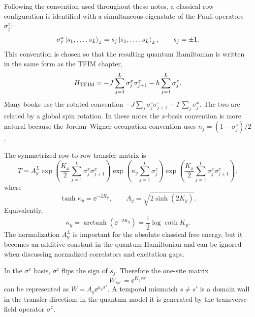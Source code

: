 Following the convention used throughout these notes, a classical row
configuration is identified with a simultaneous eigenstate of the Pauli
operators $\sigma_j^x$:
\begin{equation}
\label{eq:ising-tfim-x-basis-row-state}
    \sigma_j^x\left|s_1,\ldots,s_L\right\rangle_x
    =
    s_j\left|s_1,\ldots,s_L\right\rangle_x,
    \qquad
    s_j=\pm1 .
\end{equation}
This convention is chosen so that the resulting quantum Hamiltonian is written
in the same form as the TFIM chapter,
\begin{equation}
\label{eq:ising-tfim-quantum-hamiltonian-target}
    H_{\rm TFIM}
    =
    -J\sum_{j=1}^{L}\sigma_j^x\sigma_{j+1}^x
    -h\sum_{j=1}^{L}\sigma_j^z .
\end{equation}
Many books use the rotated convention
$-J\sum_j\sigma_j^z\sigma_{j+1}^z-\Gamma\sum_j\sigma_j^x$.  The two are related
by a global spin rotation.  In these notes the $x$-basis convention is more
natural because the Jordan--Wigner occupation convention uses
$n_j=(1-\sigma_j^z)/2$.

The symmetrized row-to-row transfer matrix is
\begin{equation}
\label{eq:ising-tfim-symmetric-transfer-matrix}
    T
    =
    A_y^L
    \exp\left(
        \frac{K_x}{2}\sum_{j=1}^{L}\sigma_j^x\sigma_{j+1}^x
    \right)
    \exp\left(
        \kappa_y\sum_{j=1}^{L}\sigma_j^z
    \right)
    \exp\left(
        \frac{K_x}{2}\sum_{j=1}^{L}\sigma_j^x\sigma_{j+1}^x
    \right),
\end{equation}
where
\begin{equation}
\label{eq:ising-tfim-kappa-definition}
    \tanh\kappa_y=\ee^{-2K_y},
    \qquad
    A_y=\sqrt{2\sinh(2K_y)} .
\end{equation}
Equivalently,
\begin{equation}
\label{eq:ising-tfim-kappa-log-coth}
    \kappa_y
    =
    \operatorname{arctanh}(\ee^{-2K_y})
    =
    \frac12\log\coth K_y .
\end{equation}
The normalization $A_y^L$ is important for the absolute classical free energy,
but it becomes an additive constant in the quantum Hamiltonian and can be ignored
when discussing normalized correlators and excitation gaps.

\begin{remark}
In the $\sigma^x$ basis, $\sigma^z$ flips the sign of $s_j$.  Therefore the
one-site matrix
\begin{equation}
    W_{ss'}=\ee^{K_yss'}
\end{equation}
can be represented as $W=A_y\ee^{\kappa_y\sigma^z}$.  A temporal mismatch
$s\neq s'$ is a domain wall in the transfer direction; in the quantum model it is
generated by the transverse-field operator $\sigma^z$.
\end{remark}

